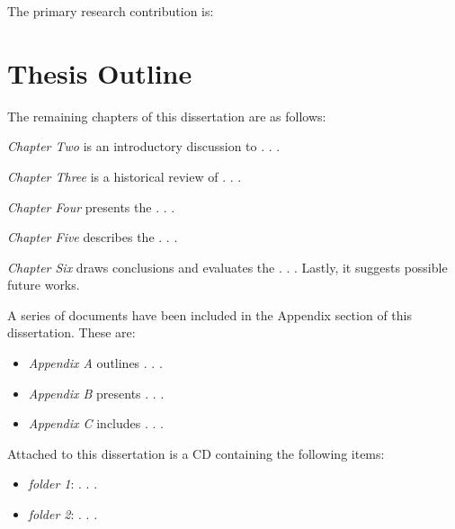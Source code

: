 The primary research contribution is: 





\section{Thesis Outline} 

The remaining chapters of this dissertation are as follows:


\emph{Chapter Two} is an introductory discussion to . . .

\emph{Chapter Three} is a historical review of  . . .

\emph{Chapter Four} presents the  . . . 

\emph{Chapter Five} describes the . . .

\emph{Chapter Six} draws conclusions and evaluates the . . .  Lastly, it suggests possible future works. 

\vspace{5 mm}

A series of documents have been included in the Appendix section of this dissertation. These are:

\begin{itemize}
\item \emph{Appendix A} outlines . . .

\item \emph{Appendix B} presents . . .

\item \emph{Appendix C} includes . . .
\end{itemize} 

\vspace{5 mm}

Attached to this dissertation is a CD containing the following items:

\begin{itemize}
\item \emph{folder 1}: . . .

\item \emph{folder 2}: . . .

\end{itemize}





